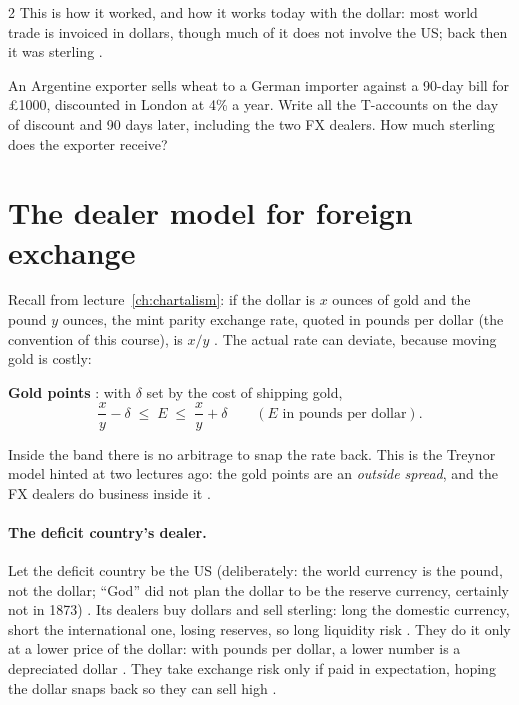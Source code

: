 \begin{paracol}{2}
This is how it worked, and how it works today with the dollar: most world trade is invoiced in dollars, though much of it does not involve the US; back then it
was sterling .

\begin{exercise}
An Argentine exporter sells wheat to a German importer against a 90-day bill for \pounds1000, discounted in London at 4\% a year. Write all the T-accounts on the day
of discount and 90 days later, including the two FX dealers. How much sterling does the exporter receive?
\end{exercise}

\section{The dealer model for foreign exchange}\label{sec:gl-fxdealer}

Recall from lecture~\ref{ch:chartalism}: if the dollar is $x$ ounces of gold and the pound $y$ ounces, the mint parity exchange rate, quoted in pounds per dollar
(the convention of this course), is $x/y$ . The actual rate can deviate, because moving gold is costly:
\begin{keyformulas}
\textbf{Gold points} : with $\delta$ set by the cost of shipping gold,
\[
  \frac{x}{y}-\delta \;\le\; E \;\le\; \frac{x}{y}+\delta \qquad (E \text{ in pounds per dollar}).
\]
\end{keyformulas}

Inside the band there is no arbitrage to snap the rate back. This is the Treynor model hinted at two lectures ago: the gold points are an \emph{outside spread},
and the FX dealers do business inside it .

\paragraph{The deficit country's dealer.} Let the deficit country be the US (deliberately: the world currency is the pound, not the dollar; ``God'' did not plan
the dollar to be the reserve currency, certainly not in 1873) . Its dealers buy dollars and sell sterling: long the
domestic currency, short the international one, losing reserves, so long liquidity risk . They do it only at a lower price of the
dollar: with pounds per dollar, a lower number is a depreciated dollar . They take exchange risk only if paid in
expectation, hoping the dollar snaps back so they can sell high .


\end{paracol}

